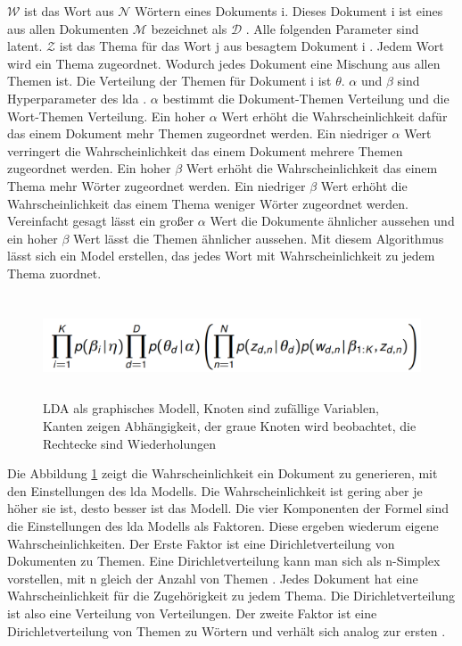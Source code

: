 $\mathcal{W}$ ist das Wort aus $\mathcal{N}$ Wörtern eines Dokuments i. Dieses Dokument i ist eines aus allen Dokumenten $\mathcal{M}$ bezeichnet als $\mathcal{D}$ \parencite[vgl.][S. 995]{Blei03latentdirichlet}. Alle folgenden Parameter sind latent. $\mathcal{Z}$ ist das Thema für das Wort j aus besagtem Dokument i \parencite[vgl.][S. 996-997]{Blei03latentdirichlet} \parencite[vgl.][S. 27]{ProbabilisticTopicModels}. Jedem Wort wird ein Thema zugeordnet. Wodurch jedes Dokument eine Mischung aus allen Themen ist. Die Verteilung der Themen für Dokument i ist $\theta$. $\alpha$ und $\beta$ sind Hyperparameter des \gls{lda} \parencite[vgl.][S. 32]{ProbabilisticTopicModels}. $\alpha$ bestimmt die Dokument-Themen Verteilung und die Wort-Themen Verteilung. Ein hoher $\alpha$ Wert erhöht die Wahrscheinlichkeit dafür das einem Dokument mehr Themen zugeordnet werden. Ein niedriger $\alpha$ Wert verringert die Wahrscheinlichkeit das einem Dokument mehrere Themen zugeordnet werden. Ein hoher $\beta$ Wert erhöht die Wahrscheinlichkeit das einem Thema mehr Wörter zugeordnet werden. Ein niedriger $\beta$ Wert erhöht die Wahrscheinlichkeit das einem Thema weniger Wörter zugeordnet werden. Vereinfacht gesagt lässt ein großer $\alpha$ Wert die Dokumente ähnlicher aussehen und ein hoher $\beta$ Wert lässt die Themen ähnlicher aussehen. Mit diesem Algorithmus lässt sich ein Model erstellen, das jedes Wort mit Wahrscheinlichkeit zu jedem Thema zuordnet.

\begin{figure}[htpb]
	\centering
	\includegraphics[width=\textwidth,height=3cm,keepaspectratio=true]{ldaDocLikelyhood.png}
	\caption{
		LDA als graphisches Modell, Knoten sind zufällige Variablen, Kanten zeigen Abhängigkeit, der graue Knoten wird beobachtet, die Rechtecke sind Wiederholungen \parencite[vgl.][S. 25]{ProbabilisticTopicModels}
	}
	\label{fig:LDA_Formel}
\end{figure}


Die Abbildung \ref{fig:LDA_Formel} zeigt die Wahrscheinlichkeit ein Dokument zu generieren, mit den Einstellungen des \gls{lda} Modells. Die Wahrscheinlichkeit ist gering aber je höher sie ist, desto besser ist das Modell. Die vier Komponenten der Formel sind die Einstellungen des \gls{lda} Modells als Faktoren. Diese ergeben wiederum eigene Wahrscheinlichkeiten. Der Erste Faktor ist eine Dirichletverteilung von Dokumenten zu Themen. Eine Dirichletverteilung kann man sich als n-Simplex vorstellen, mit n gleich der Anzahl von Themen \parencite[vgl.][S. 53-54]{ProbabilisticTopicModels}. Jedes Dokument hat eine Wahrscheinlichkeit für die Zugehörigkeit zu jedem Thema. Die Dirichletverteilung ist also eine Verteilung von Verteilungen. Der zweite Faktor ist eine Dirichletverteilung von Themen zu Wörtern und verhält sich analog zur ersten \parencite[vgl.][S. 996-999]{Blei03latentdirichlet}.

